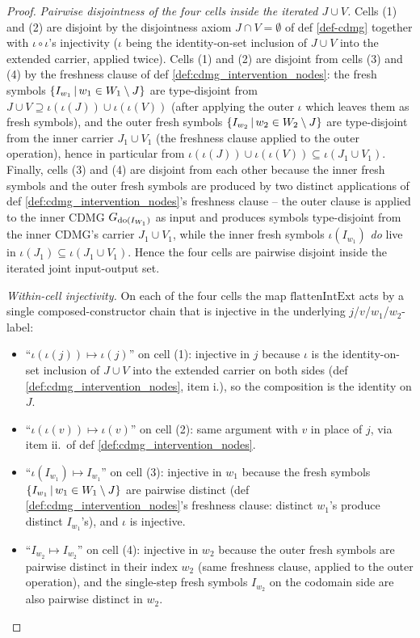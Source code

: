 \documentclass[main]{subfiles}
\providecommand{\flattenIntExt}{\mathrm{flattenIntExt}}
\begin{document}
\begin{proof}
\emph{Pairwise disjointness of the four cells inside the iterated $J \cup V$.}
Cells (1) and (2) are disjoint by the disjointness axiom $J \cap V = \emptyset$ of def \ref{def-cdmg} together with $\iota \circ \iota$'s injectivity ($\iota$ being the identity-on-set inclusion of $J \cup V$ into the extended carrier, applied twice). Cells (1) and (2) are disjoint from cells (3) and (4) by the freshness clause of def \ref{def:cdmg_intervention_nodes}: the fresh symbols $\left \{ I_{w_1} \,\middle|\, w_1 \in W_1 \setminus J \right \}$ are type-disjoint from $J \cup V \supseteq \iota(\iota(J)) \cup \iota(\iota(V))$ (after applying the outer $\iota$ which leaves them as fresh symbols), and the outer fresh symbols $\left \{ I_{w_2} \,\middle|\, w_2 \in W_2 \setminus J \right \}$ are type-disjoint from the inner carrier $J_1 \cup V_1$ (the freshness clause applied to the outer operation), hence in particular from $\iota(\iota(J)) \cup \iota(\iota(V)) \subseteq \iota(J_1 \cup V_1)$. Finally, cells (3) and (4) are disjoint from each other because the inner fresh symbols and the outer fresh symbols are produced by two distinct applications of def \ref{def:cdmg_intervention_nodes}'s freshness clause -- the outer clause is applied to the inner CDMG $G_{\operatorname{do}(I_{W_1})}$ as input and produces symbols type-disjoint from the inner CDMG's carrier $J_1 \cup V_1$, while the inner fresh symbols $\iota(I_{w_1})$ \emph{do} live in $\iota(J_1) \subseteq \iota(J_1 \cup V_1)$. Hence the four cells are pairwise disjoint inside the iterated joint input-output set.

\emph{Within-cell injectivity.}
On each of the four cells the map $\flattenIntExt$ acts by a single composed-constructor chain that is injective in the underlying $j$/$v$/$w_1$/$w_2$-label:
\begin{itemize}
    \item ``$\iota(\iota(j)) \mapsto \iota(j)$'' on cell (1): injective in $j$ because $\iota$ is the identity-on-set inclusion of $J \cup V$ into the extended carrier on both sides (def \ref{def:cdmg_intervention_nodes}, item i.), so the composition is the identity on $J$.
    \item ``$\iota(\iota(v)) \mapsto \iota(v)$'' on cell (2): same argument with $v$ in place of $j$, via item ii.\ of def \ref{def:cdmg_intervention_nodes}.
    \item ``$\iota(I_{w_1}) \mapsto I_{w_1}$'' on cell (3): injective in $w_1$ because the fresh symbols $\left \{ I_{w_1} \,\middle|\, w_1 \in W_1 \setminus J \right \}$ are pairwise distinct (def \ref{def:cdmg_intervention_nodes}'s freshness clause: distinct $w_1$'s produce distinct $I_{w_1}$'s), and $\iota$ is injective.
    \item ``$I_{w_2} \mapsto I_{w_2}$'' on cell (4): injective in $w_2$ because the outer fresh symbols are pairwise distinct in their index $w_2$ (same freshness clause, applied to the outer operation), and the single-step fresh symbols $I_{w_2}$ on the codomain side are also pairwise distinct in $w_2$.
\end{itemize}


\end{proof}
\end{document}
